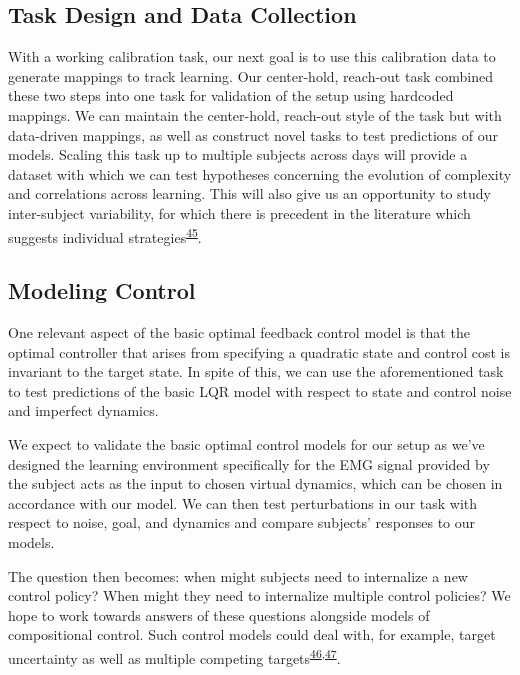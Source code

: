 \documentclass[
  a4paper,
]{article}
\begin{document}
\hypertarget{task-design-and-data-collection}{%
\subsection{Task Design and Data
Collection}\label{task-design-and-data-collection}}

With a working calibration task, our next goal is to use this
calibration data to generate mappings to track learning. Our
center-hold, reach-out task combined these two steps into one task for
validation of the setup using hardcoded mappings. We can maintain the
center-hold, reach-out style of the task but with data-driven mappings,
as well as construct novel tasks to test predictions of our models.
Scaling this task up to multiple subjects across days will provide a
dataset with which we can test hypotheses concerning the evolution of
complexity and correlations across learning. This will also give us an
opportunity to study inter-subject variability, for which there is
precedent in the literature which suggests individual
strategies\textsuperscript{\protect\hyperlink{ref-crouzierIndividualDifferencesDistribution2019}{45}}.

\hypertarget{modeling-control}{%
\subsection{Modeling Control}\label{modeling-control}}

One relevant aspect of the basic optimal feedback control model is that
the optimal controller that arises from specifying a quadratic state and
control cost is invariant to the target state. In spite of this, we can
use the aforementioned task to test predictions of the basic LQR model
with respect to state and control noise and imperfect dynamics.

We expect to validate the basic optimal control models for our setup as
we've designed the learning environment specifically for the EMG signal
provided by the subject acts as the input to chosen virtual dynamics,
which can be chosen in accordance with our model. We can then test
perturbations in our task with respect to noise, goal, and dynamics and
compare subjects' responses to our models.

The question then becomes: when might subjects need to internalize a new
control policy? When might they need to internalize multiple control
policies? We hope to work towards answers of these questions alongside
models of compositional control. Such control models could deal with,
for example, target uncertainty as well as multiple competing
targets\textsuperscript{\protect\hyperlink{ref-gallivanActionPlanCooptimization2015}{46},\protect\hyperlink{ref-gallivanParallelSpecificationCompeting2016}{47}}.
\end{document}
